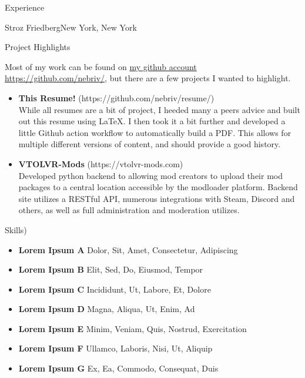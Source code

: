 \documentclass[]{mcdowellcv}
\begin{document}
\begin{cvsection}{Experience}
\begin{jobentry}{Stroz Friedberg}{New York, New York}
\begin{cvsection}{Project Highlights}
    \begin{cvsubsection}{}{}{}
        Most of my work can be found on \href{https://github.com/nebriv/}{my github account https://github.com/nebriv/}, but there are a few projects I wanted to highlight.\\
        \begin{itemize}
            \setlength\itemsep{3pt}
            \item \textbf{This Resume!} (https://github.com/nebriv/resume/)\\While all resumes are a bit of project, I heeded many a peers advice and built out this resume using LaTeX. I then took it a bit further and developed a little Github action workflow to automatically build a PDF. This allows for multiple different versions of content, and should provide a good history.
            \item \textbf{VTOLVR-Mods} (https://vtolvr-mods.com)\\Developed python backend to allowing mod creators to upload their mod packages to a central location accessible by the modloader platform. Backend site utilizes a RESTful API, numerous integrations with Steam, Discord and others, as well as full administration and moderation utilizes.
        \end{itemize}
    \end{cvsubsection}
\end{cvsection}

\begin{cvsection}{Skills)}
    \begin{cvsubsection}{}{}{}
        \begin{itemize}
            \item \textbf{Lorem Ipsum A}  Dolor, Sit, Amet, Consectetur, Adipiscing
            \item \textbf{Lorem Ipsum B}  Elit, Sed, Do, Eiusmod, Tempor
            \item \textbf{Lorem Ipsum C}  Incididunt, Ut, Labore, Et, Dolore
            \item \textbf{Lorem Ipsum D}  Magna, Aliqua, Ut, Enim, Ad
            \item \textbf{Lorem Ipsum E}  Minim, Veniam, Quis, Nostrud, Exercitation
            \item \textbf{Lorem Ipsum F}  Ullamco, Laboris, Nisi, Ut, Aliquip
            \item \textbf{Lorem Ipsum G}  Ex, Ea, Commodo, Consequat, Duis
        \end{itemize}
    \end{cvsubsection}
\end{cvsection}


\end{jobentry}
\end{cvsection}
\end{document}
